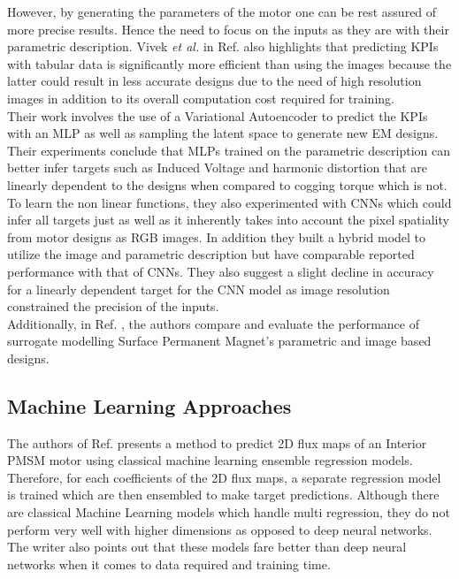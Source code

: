 \documentclass{report} %
\begin{document}
However, by generating the parameters of the motor one can be rest assured of more precise results. Hence the need to focus on the inputs as they are with their 
parametric description. Vivek \textit{et al.} in Ref. \cite{VAE-MT-2021} also highlights that predicting \ac{KPI}s with tabular data is significantly more efficient than 
using the images because the latter could result in less accurate designs due to the need of high resolution images in addition to its overall computation cost 
required for training. \\
Their work involves the use of a Variational Autoencoder to predict the \ac{KPI}s with an \ac{MLP} as well as sampling the latent space to 
generate new \ac{EM} designs.
Their experiments conclude that \ac{MLP}s trained on the parametric description can better infer targets such as Induced Voltage and harmonic distortion 
that are linearly dependent to the designs when compared to cogging torque which is not.
To learn the non linear functions, they also experimented with \ac{CNN}s which could infer all targets just as well as it inherently takes 
into account the pixel spatiality from motor designs as RGB images. In addition they built a hybrid model to utilize the image and parametric 
description but have comparable reported performance with that of \ac{CNN}s.
They also suggest a slight decline in accuracy for a linearly dependent target for the \ac{CNN} model as image resolution constrained the precision of the inputs.\\
Additionally, in Ref. \cite{EM SM-2023}, the authors compare and evaluate the performance of surrogate modelling Surface Permanent Magnet's parametric and image based designs.

\subsection{Machine Learning Approaches}\label{subsec:LR Machine Learning Approaches}
The authors of Ref. \cite{EM 2DFMP-2022} presents a method to predict 2\ac{D} flux maps of an Interior \ac{PMSM} motor using classical machine learning ensemble 
regression models. Therefore, for each coefficients of the 2\ac{D} flux maps, a separate regression model is trained which are then ensembled to make target predictions. 
Although there are classical Machine Learning models which handle multi regression, they do not perform very well with higher dimensions as opposed to deep neural 
networks. The writer also points out that these models fare better than deep neural networks when it comes to data required and training time.\\
\end{document}
